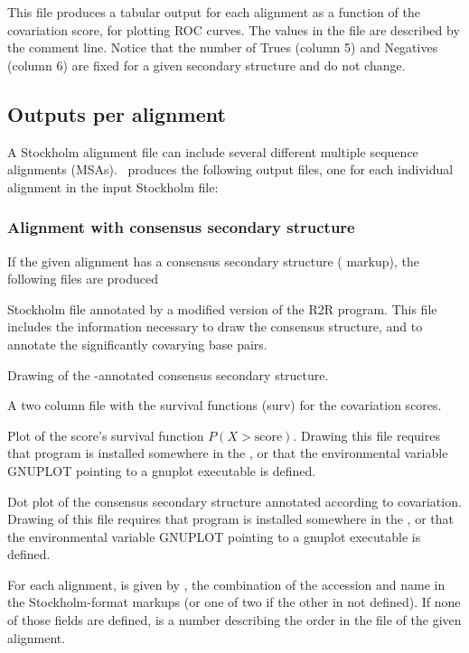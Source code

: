 This file produces a tabular output for each alignment as a function
of the covariation score, for plotting ROC curves. The values in the
file are described by the comment line. Notice that the number of
Trues (column 5) and Negatives (column 6) are fixed for a given
secondary structure and do not change.

\subsection{Outputs per alignment}

A Stockholm alignment file can include several different multiple
sequence alignments (MSAs).  \rscape\ produces the following output
files, one for each individual alignment in the input Stockholm file:

\subsubsection{Alignment with consensus secondary structure}
If the given alignment  has a consensus secondary structure
( markup), the following files are produced

\begin{sreitems}{}
\item[\emprog{rnafile\_msaname.R2R.sto}] Stockholm file annotated by a
  modified version of the R2R program. This file includes the
  information necessary to draw the consensus structure, and to
  annotate the significantly covarying base pairs.
%
\item[\emprog{rnafile\_msaname.R2R.sto.\{pdf,svg\}}] Drawing of the
  \rscape-annotated consensus secondary structure.
%
\item[\emprog{rnafile\_msaname.surv}] A two column file with the 
survival functions (surv) for the covariation scores.
%
\item[\emprog{rnafile\_msaname.surv.ps}] Plot of the score's survival function
$P(X > \mbox{score})$. Drawing this
file requires that program  is installed somewhere in
the
, or that the environmental variable GNUPLOT 
pointing to a gnuplot executable is defined.
%
\item[\emprog{rnafile\_msaname.dplot.\{ps,svg\}}] Dot plot of the consensus
  secondary structure annotated according to covariation. Drawing of this
file requires that program  is installed somewhere in the
, or that the environmental variable GNUPLOT 
pointing to a gnuplot executable is defined.
%
\end{sreitems}
For each alignment,  is given
by , the combination of the accession  and name  in the Stockholm-format markups (or
one of two if the other in not defined).  If none of those fields are
defined,  is a number describing the order in the
file of the given alignment.

